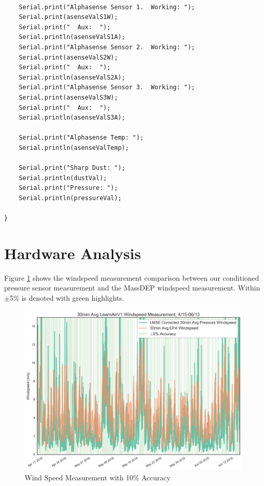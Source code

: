 \begin{lstlisting}[style=code]
    
    Serial.print("Alphasense Sensor 1.  Working: ");
    Serial.print(asenseValS1W);
    Serial.print("  Aux:  ");
    Serial.println(asenseValS1A);
    Serial.print("Alphasense Sensor 2.  Working: ");
    Serial.print(asenseValS2W);
    Serial.print("  Aux:  ");
    Serial.println(asenseValS2A);
    Serial.print("Alphasense Sensor 3.  Working: ");
    Serial.print(asenseValS3W);
    Serial.print("  Aux:  ");
    Serial.println(asenseValS3A);
    
    Serial.print("Alphasense Temp: ");
    Serial.println(asenseValTemp);
    
    Serial.print("Sharp Dust: ");
    Serial.println(dustVal);
    Serial.print("Pressure: ");
    Serial.println(pressureVal);
    
}
\end{lstlisting}

\FloatBarrier
\section{Hardware Analysis}
\FloatBarrier

Figure \ref{fig:ws_with_10_accuracy} shows the windspeed measurement comparison between our conditioned pressure sensor measurement and the MassDEP windspeed measurement. Within $\pm$5\% is denoted with green highlights.

\begin{figure}[htb]
 	\includegraphics[width=\textwidth]{figs/ws_with_10_accuracy}               
 	 \caption{Wind Speed Measurement with 10\% Accuracy}
  	\label{fig:ws_with_10_accuracy}
\end{figure}

